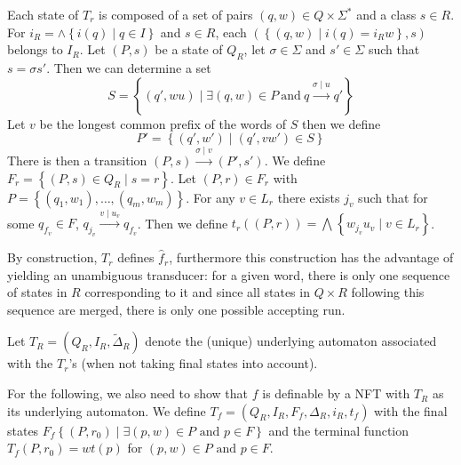 \documentclass[12pt]{report}
\theoremstyle{definition}
\theoremstyle{remark}
\begin{document}
Each state of $T_r$ is composed of a set of pairs $(q,w)\in Q\times \Sigma^\ast$ and a class $s\in R$.
For $i_R=\wedge\left\{i(q)\mid q\in I\right\}$ and $s\in R$, each $(\left\{(q,w)\mid i(q)=i_Rw\right\},s)$ belongs to $I_R$.
Let $(P,s)$ be a state of $Q_R$, let $\sigma\in \Sigma$ and $s'\in \Sigma$ such that $s=\sigma s'$.
Then we can determine a set
$$S=\left\{ (q',wu)\mid  \exists (q,w)\in P\ \mathrm{and}\ q\xrightarrow{\sigma\mid u}q'\right\}$$
Let $v$ be the longest common prefix of the words of $S$ then we define
$$P'=\left\{ (q',w')\mid   (q',vw')\in S\right\}$$
There is then a transition $(P,s)\xrightarrow{\sigma\mid v}(P',s')$.
We define $F_r=\left\{ (P,s)\in Q_R\mid  s=r \right\}$.
Let $(P,r)\in F_r$ with $P=\left\{(q_1,w_1),\ldots, (q_m,w_m) \right\}$. For any $v\in L_r$ there exists $j_v$ such that for some $q_{f_v}\in F$, $q_{j_v}\xrightarrow{v\mid u_v}q_{f_v}$.
Then we define $t_r((P,r))=\bigwedge_{} \left\{ w_{j_v}u_v\mid v\in L_r\right\}$.

By construction, $T_r$ defines $\widehat f_r$, furthermore this construction has the advantage of yielding an unambiguous transducer: for a given word, there is only one sequence of states in $R$ corresponding to it and since all states in $Q\times R$ following this sequence are merged, there is only one possible accepting run.

Let $T_R=(Q_R,I_R,\tilde\Delta_R)$ denote the (unique) underlying automaton associated with the $T_r$'s (when not taking final states into account).

For the following, we also need to show that $f$ is definable by a NFT with $T_R$ as its underlying automaton. We define $T_f=(Q_R,I_R,F_f,\Delta_R,i_R,t_f)$ with the final states $F_f\left\{(P,r_0)\mid \exists (p,w)\in P \text{ and } p\in F\right\}$ and the terminal function $T_f(P,r_0)=wt(p)$ for $(p,w)\in P \text{ and } p\in F$.
\end{document}
